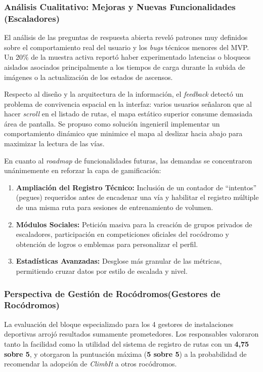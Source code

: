 \subsubsection{Análisis Cualitativo: Mejoras y Nuevas Funcionalidades (Escaladores)}

El análisis de las preguntas de respuesta abierta reveló patrones muy definidos sobre el comportamiento real del usuario y los \textit{bugs} técnicos menores del MVP. Un 20\% de la muestra activa reportó haber experimentado latencias o bloqueos aislados asociados principalmente a los tiempos de carga durante la subida de imágenes o la actualización de los estados de ascensos.

Respecto al diseño y la arquitectura de la información, el \textit{feedback} detectó un problema de convivencia espacial en la interfaz: varios usuarios señalaron que al hacer \textit{scroll} en el listado de rutas, el mapa estático superior consume demasiada área de pantalla. Se propuso como solución ingenieril implementar un comportamiento dinámico que minimice el mapa al deslizar hacia abajo para maximizar la lectura de las vías.

En cuanto al \textit{roadmap} de funcionalidades futuras, las demandas se concentraron unánimemente en reforzar la capa de gamificación:
\begin{enumerate}
    \item \textbf{Ampliación del Registro Técnico:} Inclusión de un contador de ``intentos'' (pegues) requeridos antes de encadenar una vía y habilitar el registro múltiple de una misma ruta para sesiones de entrenamiento de volumen.
    \item \textbf{Módulos Sociales:} Petición masiva para la creación de grupos privados de escaladores, participación en competiciones oficiales del rocódromo y obtención de logros o emblemas para personalizar el perfil.
    \item \textbf{Estadísticas Avanzadas:} Desglose más granular de las métricas, permitiendo cruzar datos por estilo de escalada y nivel.
\end{enumerate}

\subsubsection{Perspectiva de Gestión de Rocódromos(Gestores de Rocódromos)}

La evaluación del bloque especializado para los 4 gestores de instalaciones deportivas arrojó resultados sumamente prometedores. Los responsables valoraron tanto la facilidad como la utilidad del sistema de registro de rutas con un \textbf{4,75 sobre 5}, y otorgaron la puntuación máxima (\textbf{5 sobre 5}) a la probabilidad de recomendar la adopción de \textit{ClimbIt} a otros rocódromos.


